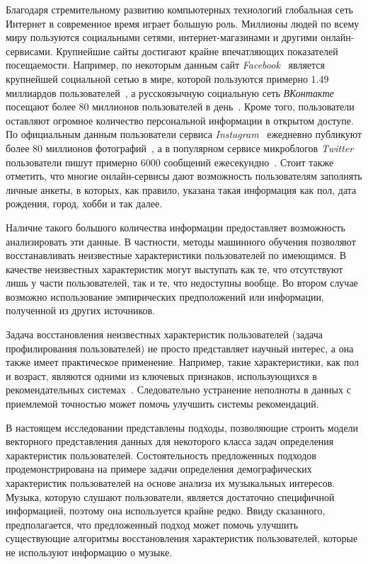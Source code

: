 \startprefacepage

Благодаря стремительному развитию компьютерных технологий глобальная
сеть Интернет в современное время играет большую роль. Миллионы
людей по всему миру пользуются социальными сетями, интернет-магазинами
и другими онлайн-сервисами. Крупнейшие сайты достигают крайне
впечатляющих показателей посещаемости. Например, по некоторым данным 
сайт \textit{Facebook}~\cite{facebook} является крупнейшей социальной
 сетью в мире, которой пользуются примерно 1.49 миллиардов 
пользователей~\cite{facebook_stat}, а русскоязычную социальную 
сеть \textit{ВКонтакте}~\cite{vk} посещают более 80 миллионов пользователей в 
день~\cite{vk_stat}. Кроме того, пользователи оставляют огромное количество
персональной информации в открытом доступе. По
официальным данным пользователи сервиса \textit{Instagram}~\cite{insta}
ежедневно публикуют более 80 миллионов
фотографий~\cite{insta_stat}, а
в популярном сервисе микроблогов \textit{Twitter}~\cite{twitter}
пользователи пишут примерно 6000 сообщений
ежесекундно~\cite{twitter_stat}.
Стоит также отметить, что многие онлайн-сервисы дают
возможность пользователям заполнять личные анкеты,
в которых, как правило, указана такая информация как
пол, дата рождения, город, хобби и так далее.

Наличие такого большого количества информации предоставляет возможность
анализировать эти данные. В частности, методы машинного обучения 
позволяют восстанавливать неизвестные характеристики пользователей по имеющимся.
В качестве неизвестных характеристик могут выступать как те,
что отсутствуют лишь у части пользователей, так и те, что недоступны
вообще. Во втором случае возможно использование эмпирических
предположений или информации, полученной из других источников.

Задача восстановления неизвестных характеристик пользователей 
(задача профилирования пользователей) не просто представляет
научный интерес, а она также имеет практическое применение. 
Например, такие характеристики, как пол и возраст, являются
одними из ключевых признаков, использующихся в рекомендательных
системах~\cite{swearingen2001beyond,adomavicius2005toward}.
Следовательно устранение неполноты в данных с приемлемой точностью
может помочь улучшить системы рекомендаций.

В настоящем исследовании представлены подходы, позволяющие
строить модели векторного представления данных для некоторого класса
задач определения характеристик пользователей. Состоятельность
предложенных подходов продемонстрирована на примере задачи определения
демографических характеристик пользователей на основе анализа их
музыкальных интересов. Музыка, которую слушают пользователи, является
достаточно специфичной информацией, поэтому она используется крайне редко.
Ввиду сказанного, предполагается, что предложенный подход может помочь
улучшить существующие алгоритмы восстановления характеристик пользователей,
которые не используют информацию о музыке.
